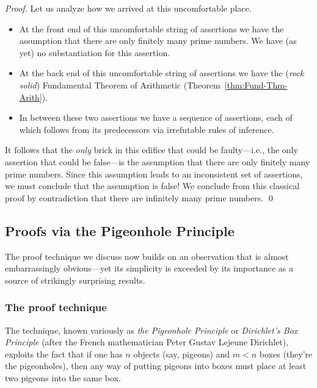 \begin{proof}
\medskip

Let us analyze how we arrived at this uncomfortable place.
\begin{itemize}
\item
At the front end of this uncomfortable string of assertions we have the assumption that there are only finitely many prime numbers.  We have (as yet) no substantiation for this assertion.
\medskip\item
At the back end of this uncomfortable string of assertions we have the ({\em rock solid}) Fundamental Theorem of Arithmetic (Theorem~\ref{thm:Fund-Thm-Arith}).
\medskip\item
In between these two assertions we have a sequence of assertions, each of which follows from its predecessors via irrefutable rules of inference.
\end{itemize}
It follows that the {\em only} brick in this edifice that could be faulty---i.e., the only assertion that could be false---is the assumption that there are only finitely many prime numbers.  Since this assumption leads to an inconsistent set of assertions, we must conclude that the assumption is false!  We conclude from this classical proof by contradiction that there are infinitely many prime
numbers.  \qed
\end{proof}


\subsection{Proofs via the Pigeonhole Principle}
\label{sec:pigeonhole}

The proof technique we discuss now builds on an observation that is almost embarrassingly obvious---yet its simplicity is exceeded by its importance as a source of strikingly surprising results.

\subsubsection{The proof technique}

 

The technique, known variously as {\it the Pigeonhole Principle} or {\it Dirichlet's Box Principle}
(after the French mathematician Peter Gustav Lejeune Dirichlet), exploits the fact that if one has $n$ objects (say, pigeons) and $m < n$ boxes (they're the pigeonholes), then any way of putting pigeons into boxes must place at least two pigeons into the same box.


